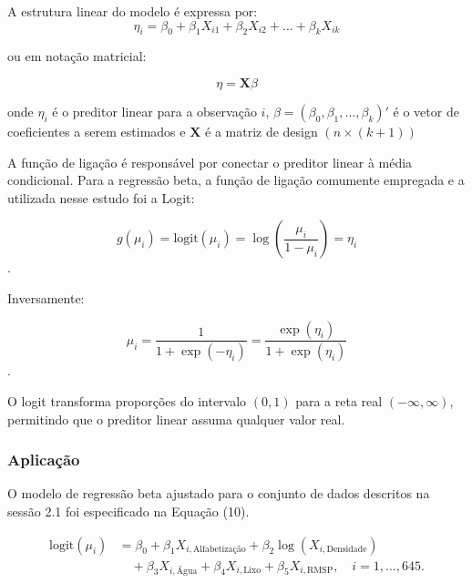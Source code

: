 \documentclass[12pt, a4paper]{article}
\begin{document}
A estrutura linear do modelo é expressa por:
\begin{equation}
\eta_i = \beta_0 + \beta_1X_{i1} + \beta_2X_{i2} + \dots + \beta_kX_{ik}
\end{equation}

\setlength{\parindent}{0cm}
ou em notação matricial:

\begin{equation}
\eta = \mathbf{X}\beta
\end{equation}

\setlength{\parindent}{1.25cm}
onde $\eta_i$ é o preditor linear para a observação $i$, $\beta = (\beta_0, \beta_1, \dots, \beta_k)'$ é o vetor de coeficientes a serem estimados e $\mathbf{X}$ é a matriz de design $(n \times (k+1))$

A função de ligação é responsável por conectar o preditor linear à média condicional. Para a regressão beta, a função de ligação comumente empregada e a utilizada nesse estudo foi a Logit:

\begin{equation}
g(\mu_i) = \text{logit}(\mu_i) = \log\left(\frac{\mu_i}{1-\mu_i}\right) = \eta_i
\end{equation}.

Inversamente:

\begin{equation}
\mu_i = \frac{1}{1 + \exp(-\eta_i)} = \frac{\exp(\eta_i)}{1 + \exp(\eta_i)}
\end{equation}.

O logit transforma proporções do intervalo $(0,1)$ para a reta real $(-\infty, \infty)$, permitindo que o preditor linear assuma qualquer valor real.

\subsubsection{Aplicação}

O modelo de regressão beta ajustado para o conjunto de dados descritos na sessão 2.1 foi especificado na Equação (10).

\begin{equation}
\begin{split}
\text{logit}(\mu_i) &= \beta_0 + \beta_1 X_{i,\text{Alfabetização}} + \beta_2 \log(X_{i,\text{Densidade}}) \\
&\quad + \beta_3 X_{i,\text{Água}} + \beta_4 X_{i,\text{Lixo}} + \beta_5 X_{i,\text{RMSP}}, \quad i = 1, \ldots, 645.
\end{split}
\end{equation}
\end{document}
